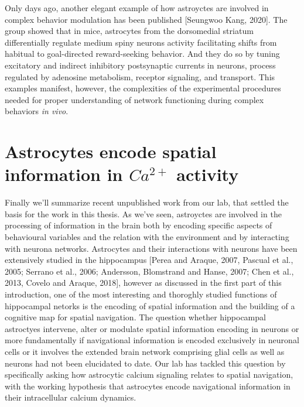 Only days ago, another elegant example of how astroyctes are involved in complex behavior modulation has been published [Seungwoo Kang, 2020]. 
The group showed that in mice, astrocytes from the dorsomedial striatum differentially regulate medium spiny neurons activity facilitating shifts from habitual to goal-directed reward-seeking behavior.
And they do so by tuning excitatory and indirect inhibitory postsynaptic currents in neurons, process regulated by adenosine metabolism, receptor signaling, and transport. 
This examples manifest, however, the complexities of the experimental procedures needed for proper understanding of network functioning during complex behaviors \textit{in vivo}.
\section{Astrocytes encode spatial information in $Ca^{2+}$ activity}
\label{chap1:sec3:astro_spat_info}
Finally we'll summarize recent unpublished work from our lab, that settled the basis for the work in this thesis.
As we've seen, astroyctes are involved in the processing of information in the brain both by encoding specific aspects of behavioural variables and the relation with the environment and by interacting with neurona networks. 
Astrocytes and their interactions with neurons have been extensively studied in the hippocampus [Perea and Araque, 2007, Pascual et al., 2005; Serrano et al., 2006; Andersson, Blomstrand and Hanse, 2007; Chen et al., 2013, Covelo and Araque, 2018], however as discussed in the first part of this introduction, one of the most interesting and thoroghly studied functions of hippocampal netorks is the encoding of spatial information and the building of a cognitive map for spatial navigation.
The question whether hippocampal astroctyes intervene, alter or modulate spatial information encoding in neurons or more fundamentally if navigational information is encoded exclusively in neuronal cells or it involves the extended brain network comprising glial cells as well as neurons had not been elucidated to date. 
Our lab has tackled this question by specifically asking how astrocytic calcium signaling relates to spatial navigation, with the working hypothesis that astrocytes encode navigational information in their intracellular calcium dynamics. 

